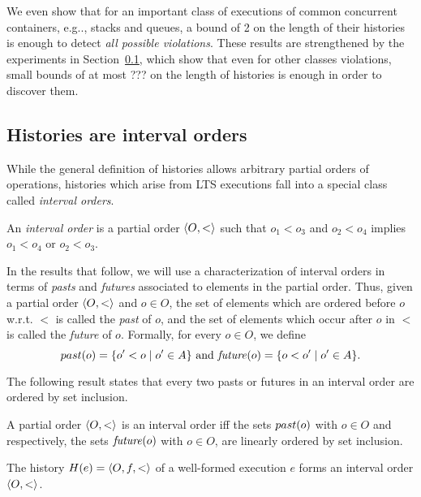 We even show that for an important class of executions of common concurrent containers, e.g.., stacks and queues, a
bound of 2 on the length of their histories is enough to detect \emph{all
possible violations}. These results are strengthened by the experiments in
Section~\ref{}, which show that even for other classes violations, small bounds
of at most ??? on the length of histories is enough in order to discover them.


\subsection{Histories are interval orders}

While the general definition of histories allows arbitrary partial orders of
operations, histories which arise from LTS executions fall into a special class
called \emph{interval orders}.

\begin{definition}

  An \emph{interval order} is a partial order $\left\langle {O,<} \right\rangle$ such that
  $o_1 < o_3$ and $o_2 < o_4$ implies $o_1 < o_4$ or $o_2 < o_3$.

\end{definition}

In the results that follow, we will use a characterization of interval orders 
in terms of \emph{pasts} and \emph{futures} associated to elements in the partial order.
Thus, given a partial order $\left\langle {O,<} \right\rangle$ and $o\in O$, the set of elements which
are ordered before $o$ w.r.t. $<$ is called the \emph{past} of $o$, and the set
of elements which occur after $o$ in $<$ is called the \emph{future} of $o$.
Formally, for every $o\in O$, we define
\[
past({o})=\{o' < o\mid o'\in A\}\mbox{ and }\mathit{future}({o})=\{o < o'\mid o'\in A\}.
\]


The following result states that every two pasts or futures in an interval
order are ordered by set inclusion.

\begin{lemma}

  A partial order $\left\langle {O,<} \right\rangle$ is an interval order iff the sets $past({o})$ with $o\in O$ and respectively,  the sets $\mathit{future}({o})$
  with $o\in O$, are
  linearly ordered by set inclusion. 

\end{lemma}

\begin{lemma}
  \label{lem:intervals}

  The history $H(e) = \left\langle {O,f,<} \right\rangle$ of a well-formed execution $e$ forms an
  interval order $\left\langle {O,<} \right\rangle$.

\end{lemma}

